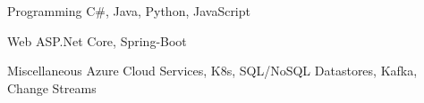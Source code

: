

\begin{cvskills}

  \cvskill
    {Programming} %
    {C\#, Java, Python, JavaScript} %


  \cvskill
    {Web} %
    {ASP.Net Core, Spring-Boot} %

  \cvskill
    {Miscellaneous} %
    {Azure Cloud Services, K8s, SQL/NoSQL Datastores, Kafka, Change Streams} %

\end{cvskills}

